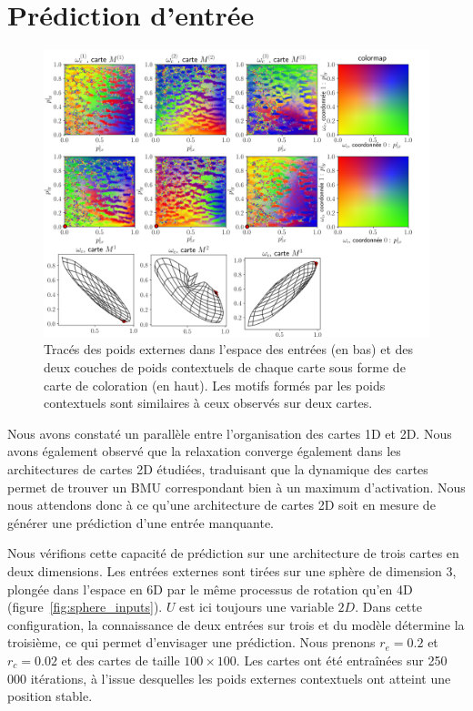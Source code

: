 \documentclass[../main]{subfiles}
\begin{document}
\section{Prédiction d'entrée \label{par:pred2D}}

\begin{figure}
	\includegraphics[width=\textwidth]{3SOM_S_wc_239999.png}
	\caption{Tracés des poids externes dans l'espace des entrées (en bas) et des deux couches de poids contextuels de chaque carte sous forme de carte de coloration (en haut). Les motifs formés par les poids contextuels sont similaires à ceux observés sur deux cartes. \label{fig:3som_w}}
\end{figure}

Nous avons constaté un parallèle entre l'organisation des cartes 1D et 2D. Nous avons également observé que la relaxation converge également dans les architectures de cartes 2D étudiées, traduisant que la dynamique des cartes permet de trouver un BMU correspondant bien à un maximum d'activation.
Nous nous attendons donc à ce qu'une architecture de cartes 2D soit en mesure de générer une prédiction d'une entrée manquante.

Nous vérifions cette capacité de prédiction sur une architecture de trois cartes en deux dimensions. 
Les entrées externes sont tirées sur une sphère de dimension 3, plongée dans l'espace en 6D par le même processus de rotation qu'en 4D (figure~\ref{fig:sphere_inputs}). $U$ est ici toujours une variable $2D$. 
Dans cette configuration, la connaissance de deux entrées sur trois et du modèle détermine la troisième, ce qui permet d'envisager une prédiction.
Nous prenons $r_e = 0.2$ et $r_c = 0.02$ et des cartes de taille $100 \times 100$. Les cartes ont été entraînées sur 250 000 itérations, à l'issue desquelles les poids externes contextuels ont atteint une position stable.
\end{document}

